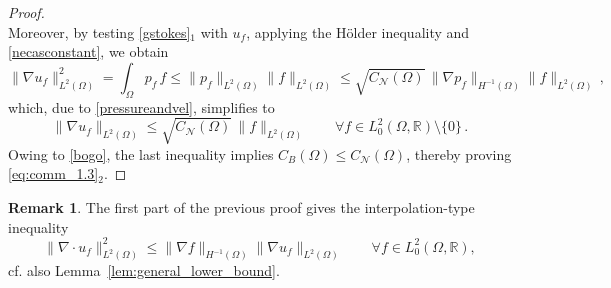 \documentclass[11pt]{article}
\theoremstyle{plain}
\theoremstyle{definition}
\newtheorem{remark}[theorem]{Remark}
\numberwithin{equation}{section}
\newcommand{\R}{\mathbb{R}}
\begin{document}
\begin{proof}
\begin{equation}
\end{equation}
Moreover, by testing \eqref{gstokes}$_1$ with $u_{f}$, applying the H\"older inequality and \eqref{necasconstant}, we obtain
$$
\| \nabla u_{f} \|^{2}_{L^{2}(\Omega)} = \int_{\Omega} p_{f} \, f \leq \|p_{f}\|_{L^2(\Omega)} \|f\|_{L^2(\Omega)} \leq \sqrt{C_{\mathcal{N}}(\Omega)} \, \| \nabla p_{f} \|_{H^{-1}(\Omega)} \|f\|_{L^2(\Omega)} \, ,
$$
which, due to \eqref{pressureandvel}, simplifies to
$$
\| \nabla u_{f} \|_{L^{2}(\Omega)} \leq \sqrt{C_{\mathcal{N}}(\Omega)} \, \|f\|_{L^2(\Omega)} \qquad \forall f\in L^2_0 (\Omega,\R) \setminus \{0\} \, .
$$
Owing to \eqref{bogo}, the last inequality implies $C_B(\Omega) \leq C_{\mathcal{N}}(\Omega)$, thereby proving \eqref{eq:comm_1.3}$_2$.
\end{proof}

\begin{remark}
	The first part of the previous proof gives the interpolation-type inequality
	 $$
	 \|\nabla\cdot u_f\|_{L^2(\Omega)}^2 \le 
	\| \nabla f\|_{H^{-1}(\Omega)} \|\nabla u_f\|_{L^2(\Omega)}
	\qquad\forall f\in L^2_0 (\Omega,\R),
	$$
cf. also Lemma~\ref{lem:general_lower_bound}.	
\end{remark}
\end{document}
